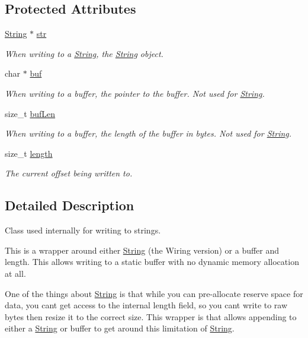 \subsection*{Protected Attributes}
\begin{DoxyCompactItemize}
\item 
\hyperlink{class_string}{String} $\ast$ \hyperlink{class_json_parser_string_ac98659ff5a56537979b6c60d28648224}{str}
\begin{DoxyCompactList}\small\item\em When writing to a \hyperlink{class_string}{String}, the \hyperlink{class_string}{String} object. \end{DoxyCompactList}\item 
char $\ast$ \hyperlink{class_json_parser_string_a3ffd87df1aff38ff4142fad32e1e3de0}{buf}
\begin{DoxyCompactList}\small\item\em When writing to a buffer, the pointer to the buffer. Not used for \hyperlink{class_string}{String}. \end{DoxyCompactList}\item 
size\+\_\+t \hyperlink{class_json_parser_string_a376957bb37fc229f44d0d85ce74adb4a}{buf\+Len}
\begin{DoxyCompactList}\small\item\em When writing to a buffer, the length of the buffer in bytes. Not used for \hyperlink{class_string}{String}. \end{DoxyCompactList}\item 
size\+\_\+t \hyperlink{class_json_parser_string_a2b3a350599c49f6e7e368fc8b508cf6f}{length}
\begin{DoxyCompactList}\small\item\em The current offset being written to. \end{DoxyCompactList}\end{DoxyCompactItemize}


\subsection{Detailed Description}
Class used internally for writing to strings. 

This is a wrapper around either \hyperlink{class_string}{String} (the Wiring version) or a buffer and length. This allows writing to a static buffer with no dynamic memory allocation at all.

One of the things about \hyperlink{class_string}{String} is that while you can pre-\/allocate reserve space for data, you can\textquotesingle{}t get access to the internal length field, so you can\textquotesingle{}t write to raw bytes then resize it to the correct size. This wrapper is that allows appending to either a \hyperlink{class_string}{String} or buffer to get around this limitation of \hyperlink{class_string}{String}.

